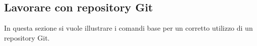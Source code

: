 \subsection{Lavorare con repository Git}
In questa sezione si vuole illustrare i comandi base per un corretto utilizzo di un repository Git.
